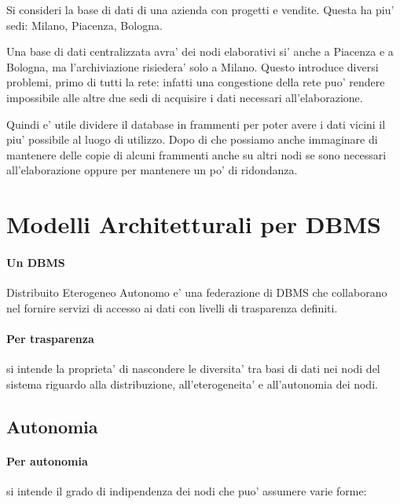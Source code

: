 Si consideri la base di dati di una azienda con progetti e vendite. Questa ha piu' sedi: Milano, Piacenza, Bologna.


Una base di dati centralizzata avra' dei nodi elaborativi si' anche a Piacenza e a Bologna, ma l'archiviazione risiedera' solo a Milano.
Questo introduce diversi problemi, primo di tutti la rete: infatti una congestione della rete puo' rendere impossibile alle altre due sedi di acquisire i dati necessari all'elaborazione.


Quindi e' utile dividere il database in frammenti per poter avere i dati vicini il piu' possibile al luogo di utilizzo.
Dopo di che possiamo anche immaginare di mantenere delle copie di alcuni frammenti anche su altri nodi se sono necessari all'elaborazione oppure per mantenere un po' di ridondanza.


\section{Modelli Architetturali per DBMS}

\paragraph{Un DBMS} Distribuito Eterogeneo Autonomo e' una federazione di DBMS che collaborano nel fornire servizi di accesso ai dati con livelli di trasparenza definiti.


\paragraph{Per trasparenza} si intende la proprieta' di nascondere le diversita' tra basi di dati nei nodi del sistema riguardo alla distribuzione, all'eterogeneita' e all'autonomia dei nodi.

\subsection{Autonomia}

\paragraph{Per autonomia} si intende il grado di indipendenza dei nodi che puo' assumere varie forme:

